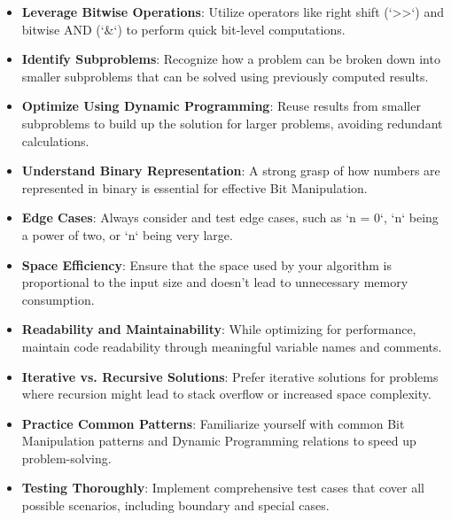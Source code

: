 \begin{itemize}
    \item \textbf{Leverage Bitwise Operations}: Utilize operators like right shift (`>>`) and bitwise AND (`\&`) to perform quick bit-level computations.
    
    \item \textbf{Identify Subproblems}: Recognize how a problem can be broken down into smaller subproblems that can be solved using previously computed results.
    
    \item \textbf{Optimize Using Dynamic Programming}: Reuse results from smaller subproblems to build up the solution for larger problems, avoiding redundant calculations.
    
    \item \textbf{Understand Binary Representation}: A strong grasp of how numbers are represented in binary is essential for effective Bit Manipulation.
    
    \item \textbf{Edge Cases}: Always consider and test edge cases, such as `n = 0`, `n` being a power of two, or `n` being very large.
    
    \item \textbf{Space Efficiency}: Ensure that the space used by your algorithm is proportional to the input size and doesn't lead to unnecessary memory consumption.
    
    \item \textbf{Readability and Maintainability}: While optimizing for performance, maintain code readability through meaningful variable names and comments.
    
    \item \textbf{Iterative vs. Recursive Solutions}: Prefer iterative solutions for problems where recursion might lead to stack overflow or increased space complexity.
    
    \item \textbf{Practice Common Patterns}: Familiarize yourself with common Bit Manipulation patterns and Dynamic Programming relations to speed up problem-solving.
    
    \item \textbf{Testing Thoroughly}: Implement comprehensive test cases that cover all possible scenarios, including boundary and special cases.
\end{itemize}

